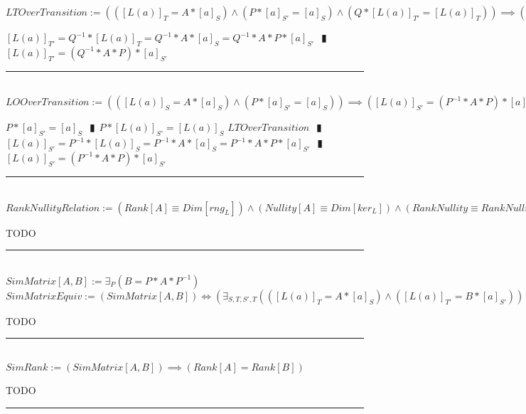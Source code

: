 \documentclass{book}
\newcommand{\abr}{:=}
\newcommand{\pipe}{$\phantom{(}\vrectangleblack\phantom{)}$}
\newcommand{\pr}[1]{\left(#1\right)}
\begin{document}
$LTOverTransition \abr \pr{\pr{[L(a)]_T = A * [a]_S} \land (P * [a]_{S'} = [a]_S) \land \pr{Q * [L(a)]_{T'} = [L(a)]_T}} \implies \pr{[L(a)]_{T'} = (Q^{-1} * A * P) * [a]_{S'}}$
\begin{enumerate}
  \lit $[L(a)]_{T'} = Q^{-1} * [L(a)]_T = Q^{-1} * A * [a]_S = Q^{-1} * A * P * [a]_{S'}$ \pipe $[L(a)]_{T'} = (Q^{-1} * A * P) * [a]_{S'}$
\end{enumerate} \vspace{.75mm} \hrule \vspace{.75mm} \ \\ 

$LOOverTransition \abr \pr{\pr{[L(a)]_S = A * [a]_S} \land (P * [a]_{S'} = [a]_S)} \implies \pr{[L(a)]_{S'} = (P^{-1} * A * P) * [a]_{S'}}$
\begin{enumerate}
  \lit $P * [a]_{S'} = [a]_S$ \pipe $P * [L(a)]_{S'} = [L(a)]_S$
  \lit $LTOverTransition$ \pipe $[L(a)]_{S'} = P^{-1} * [L(a)]_S = P^{-1} * A * [a]_S = P^{-1} * A * P * [a]_{S'}$ \pipe $[L(a)]_{S'} = (P^{-1} * A * P) * [a]_{S'}$
\end{enumerate} \vspace{.75mm} \hrule \vspace{.75mm} \ \\ 

$RankNullityRelation \abr (Rank[A] \equiv Dim[rng_L]) \land (Nullity[A] \equiv Dim[ker_L]) \land (RankNullity \equiv RankNullityLT)$ \\
\begin{enumerate}
  \lit TODO
\end{enumerate} \vspace{.75mm} \hrule \vspace{.75mm} \ \\ 

$SimMatrix[A, B] \abr \exists_{P}(B = P * A * P^{-1})$ \\

$SimMatrixEquiv \abr (SimMatrix[A, B]) \iff \pr{\exists_{S, T, S', T}\pr{\pr{[L(a)]_T = A * [a]_S} \land \pr{[L(a)]_{T'} = B * [a]_{S'}}}}$ \\
\begin{enumerate}
  \lit TODO
\end{enumerate} \vspace{.75mm} \hrule \vspace{.75mm} \ \\ 

$SimRank \abr (SimMatrix[A, B]) \implies (Rank[A] = Rank[B])$
\begin{enumerate}
  \lit TODO
\end{enumerate} \vspace{.75mm} \hrule \vspace{.75mm} \ \\ 
\end{document}
